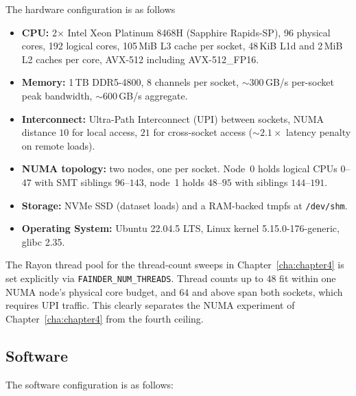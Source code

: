 The hardware configuration is as follows
\begin{itemize}
    \item \textbf{CPU:} 2$\times$ Intel Xeon Platinum 8468H (Sapphire Rapids-SP), 96 physical cores, 192 logical cores, 105\,MiB L3 cache per socket, 48\,KiB L1d and 2\,MiB L2 caches per core, AVX-512 including AVX-512\_FP16.
    \item \textbf{Memory:} 1\,TB DDR5-4800, 8 channels per socket, $\sim\!300$\,GB/s per-socket peak bandwidth, $\sim\!600$\,GB/s aggregate.
    \item \textbf{Interconnect:} Ultra-Path Interconnect (UPI) between sockets, NUMA distance $10$ for local access, $21$ for cross-socket access ($\sim\!2.1\times$ latency penalty on remote loads).
    \item \textbf{NUMA topology:} two nodes, one per socket. Node~0 holds logical CPUs $0$--$47$ with SMT siblings $96$--$143$, node~1 holds $48$--$95$ with siblings $144$--$191$.
    \item \textbf{Storage:} NVMe SSD (dataset loads) and a RAM-backed tmpfs at \texttt{/dev/shm}.
    \item \textbf{Operating System:} Ubuntu 22.04.5 LTS, Linux kernel 5.15.0-176-generic, glibc 2.35.
\end{itemize}

The Rayon thread pool for the thread-count sweeps in Chapter~\ref{cha:chapter4} is set explicitly via \texttt{FAINDER\_NUM\_THREADS}. Thread counts up to $48$ fit within one NUMA node's physical core budget, and $64$ and above span both sockets, which requires UPI traffic. This clearly separates the NUMA experiment of Chapter~\ref{cha:chapter4} from the fourth ceiling.

\subsection{Software\label{sec:method:sw}}

The software configuration is as follows:

